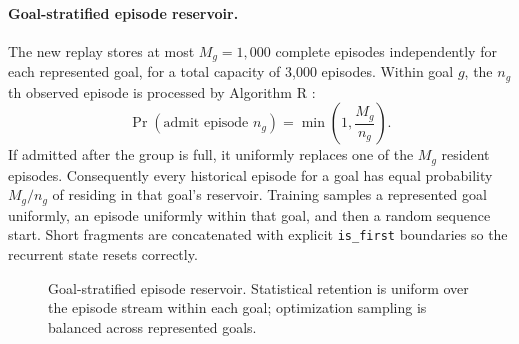 \documentclass[10pt]{article}
\begin{document}
\paragraph{Goal-stratified episode reservoir.}
The new replay stores at most $M_g=1{,}000$ complete episodes independently for each represented goal, for a total capacity of 3,000 episodes. Within goal $g$, the $n_g$th observed episode is processed by Algorithm R \citep{vitter1985reservoir}:
\begin{equation}
 \Pr(\text{admit episode }n_g)=\min\left(1,\frac{M_g}{n_g}\right).
\end{equation}
If admitted after the group is full, it uniformly replaces one of the $M_g$ resident episodes. Consequently every historical episode for a goal has equal probability $M_g/n_g$ of residing in that goal's reservoir. Training samples a represented goal uniformly, an episode uniformly within that goal, and then a random sequence start. Short fragments are concatenated with explicit \texttt{is\_first} boundaries so the recurrent state resets correctly.

\begin{figure}[H]
\centering
{}
\caption{Goal-stratified episode reservoir. Statistical retention is uniform over the episode stream within each goal; optimization sampling is balanced across represented goals.}
\label{fig:reservoir}
\end{figure}
\end{document}
